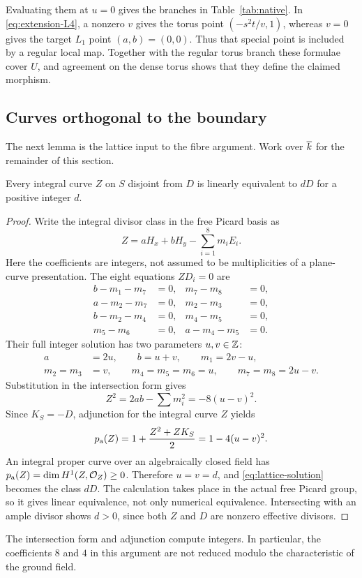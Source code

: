 Evaluating them at \(u=0\) gives the branches in
Table~\ref{tab:native}. In \eqref{eq:extension-L4}, a nonzero
\(v\) gives the torus point \((-s^2t/v,1)\), whereas \(v=0\)
gives the target \(L_1\) point \((a,b)=(0,0)\). Thus that
special point is included by a regular local map. Together with the
regular torus branch these formulae cover \(U\), and agreement on
the dense torus shows that they define the claimed morphism.

\subsection{Curves orthogonal to the boundary}

The next lemma is the lattice input to the fibre argument. Work over
\(\overline{k}\) for the remainder of this section.

\begin{lemma}\label{lem:boundary-lattice}
Every integral curve \(Z\) on \(S\) disjoint from \(D\) is
linearly equivalent to \(dD\) for a positive integer \(d\).
\end{lemma}

\begin{proof}
Write the integral divisor class in the free Picard basis as
\[
Z=aH_x+bH_y-\sum_{i=1}^{8}m_iE_i.
\]
Here the coefficients are integers, not assumed to be multiplicities
of a plane-curve presentation. The eight equations \(ZD_i=0\)
are
\begin{align*}
b-m_1-m_7&=0,& m_7-m_8&=0,\\
a-m_2-m_7&=0,& m_2-m_3&=0,\\
b-m_2-m_4&=0,& m_4-m_5&=0,\\
m_5-m_6&=0,& a-m_4-m_5&=0.
\end{align*}
Their full integer solution has two parameters \(u,v\in\mathbb Z\):
\begin{equation}\label{eq:lattice-solution}
\begin{split}
a&=2u,\qquad b=u+v,\qquad m_1=2v-u,\\
m_2=m_3&=v,\qquad m_4=m_5=m_6=u,\qquad
m_7=m_8=2u-v.
\end{split}
\end{equation}
Substitution in the intersection form gives
\[
Z^2=2ab-\sum m_i^2=-8(u-v)^2.
\]
Since \(K_S=-D\), adjunction for the integral curve \(Z\) yields
\[
p_{\mathrm a}(Z)=1+\frac{Z^2+ZK_S}{2}=1-4(u-v)^2.
\]
An integral proper curve over an algebraically closed field has
\(p_{\mathrm a}(Z)=\dim H^1(Z,\mathcal O_Z)\ge0\). Therefore \(u=v=d\),
and \eqref{eq:lattice-solution} becomes the class \(dD\).
The calculation takes place in the actual free Picard group, so it
gives linear equivalence, not only numerical equivalence.
Intersecting with an ample divisor shows \(d>0\), since both
\(Z\) and \(D\) are nonzero effective divisors.
\end{proof}

The intersection form and adjunction compute integers. In particular,
the coefficients \(8\) and \(4\) in this argument are not reduced
modulo the characteristic of the ground field.
